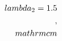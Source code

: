 \documentclass[preview]{standalone}
\begin{document}
\begin{align*}
\special{dvisvgm:raw <g id='unique000'>}\\lambda_2 = 1.5\\,\\mathrm{cm}\special{dvisvgm:raw </g>}
\end{align*}
\end{document}
